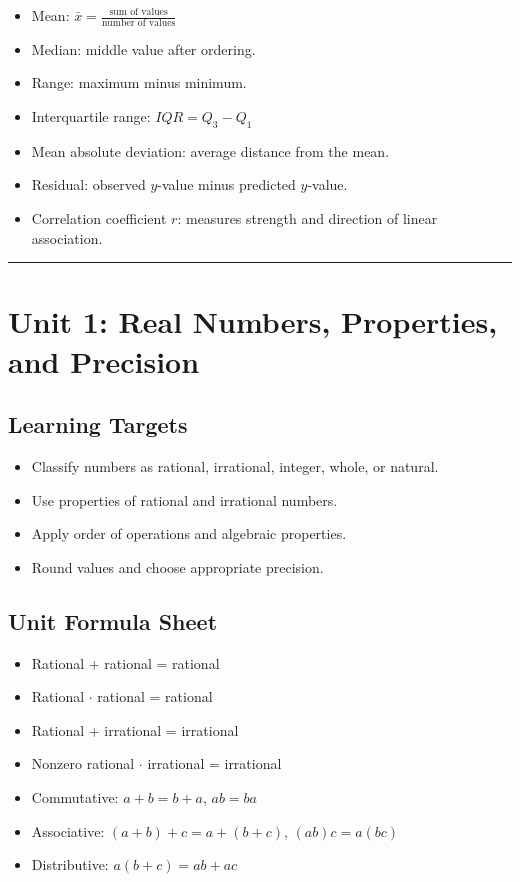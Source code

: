 \documentclass[11pt]{book}
\begin{document}
\begin{itemize}
\item Mean: \(\bar{x}=\frac{\text{sum of values}}{\text{number of values}}\)
\item Median: middle value after ordering.
\item Range: maximum minus minimum.
\item Interquartile range: \(IQR=Q_3-Q_1\)
\item Mean absolute deviation: average distance from the mean.
\item Residual: observed \(y\)-value minus predicted \(y\)-value.
\item Correlation coefficient \(r\): measures strength and direction of linear association.
\end{itemize}

\bigskip\hrule\bigskip

\chapter{Unit 1: Real Numbers, Properties, and Precision}

\section{Learning Targets}

\begin{itemize}
\item Classify numbers as rational, irrational, integer, whole, or natural.
\item Use properties of rational and irrational numbers.
\item Apply order of operations and algebraic properties.
\item Round values and choose appropriate precision.
\end{itemize}

\section{Unit Formula Sheet}

\begin{itemize}
\item Rational + rational = rational
\item Rational \(\cdot\) rational = rational
\item Rational + irrational = irrational
\item Nonzero rational \(\cdot\) irrational = irrational
\item Commutative: \(a+b=b+a\), \(ab=ba\)
\item Associative: \((a+b)+c=a+(b+c)\), \((ab)c=a(bc)\)
\item Distributive: \(a(b+c)=ab+ac\)
\end{itemize}
\end{document}
